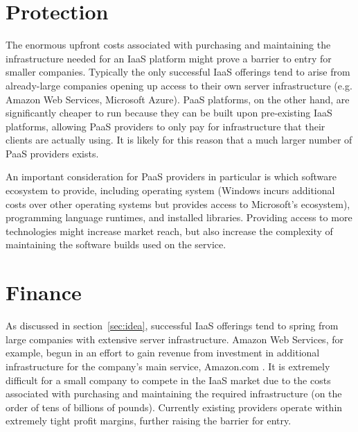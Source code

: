 \documentclass[a4paper]{proc}
\begin{document}
  \section{Protection}
  \label{sec:protection}


  The enormous upfront costs associated with purchasing and maintaining the infrastructure needed for an IaaS platform might prove a barrier to entry for smaller companies. Typically the only successful IaaS offerings tend to arise from already-large companies opening up access to their own server infrastructure (e.g. Amazon Web Services, Microsoft Azure). PaaS platforms, on the other hand, are significantly cheaper to run because they can be built upon pre-existing IaaS platforms, allowing PaaS providers to only pay for infrastructure that their clients are actually using. It is likely for this reason that a much larger number of PaaS providers exists.

  An important consideration for PaaS providers in particular is which software ecosystem to provide, including operating system (Windows incurs additional costs over other operating systems but provides access to Microsoft's ecosystem), programming language runtimes, and installed libraries. Providing access to more technologies might increase market reach, but also increase the complexity of maintaining the software builds used on the service.

  \section{Finance}
  \label{sec:finance}


  As discussed in section~\ref{sec:idea}, successful IaaS offerings tend to spring from large companies with extensive server infrastructure. Amazon Web Services, for example, begun in an effort to gain revenue from investment in additional infrastructure for the company's main service, Amazon.com \cite{Black2009}. It is extremely difficult for a small company to compete in the IaaS market due to the costs associated with purchasing and maintaining the required infrastructure (on the order of tens of billions of pounds). Currently existing providers operate within extremely tight profit margins, further raising the barrier for entry.
\end{document}
